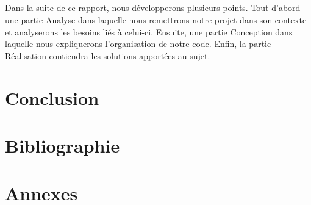 \documentclass[12pt,a4paper]{report}
\begin{document}
\paragraph*{}
Dans la suite de ce rapport, nous développerons plusieurs points. Tout d'abord une partie Analyse dans laquelle nous remettrons notre projet dans son contexte et analyserons les besoins liés à celui-ci. Ensuite, une partie Conception dans laquelle nous expliquerons l'organisation de notre code. Enfin, la partie Réalisation contiendra les solutions apportées au sujet.







\chapter*{Conclusion}

\chapter*{Bibliographie}

\chapter*{Annexes}
\end{document}
